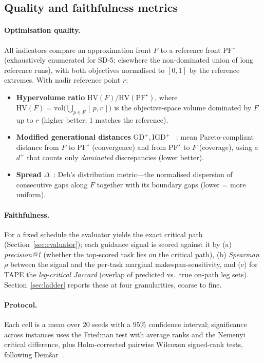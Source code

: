 \documentclass[11pt]{article}
\begin{document}
\subsection{Quality and faithfulness metrics}
\label{sec:metrics}
\paragraph{Optimisation quality.} All indicators compare an approximation front $F$ to a
reference front $\mathrm{PF}^\star$ (exhaustively enumerated for \textsf{SD-5}; elsewhere the
non-dominated union of long reference runs), with both objectives normalised to $[0,1]$ by the
reference extremes. With nadir reference point $r$:
\begin{itemize}[leftmargin=*,topsep=1pt,itemsep=1pt]
\item \textbf{Hypervolume ratio} $\mathrm{HV}(F)/\mathrm{HV}(\mathrm{PF}^\star)$, where
$\mathrm{HV}(F)=\mathrm{vol}\!\big(\bigcup_{p\in F}[\,p,r\,]\big)$ is the objective-space volume
dominated by $F$ up to $r$ (higher better; $1$ matches the reference).
\item \textbf{Modified generational distances} $\mathrm{GD}^+,\mathrm{IGD}^+$%
~\cite{ishibuchi2015igdplus}: mean Pareto-compliant distance from $F$ to $\mathrm{PF}^\star$
(convergence) and from $\mathrm{PF}^\star$ to $F$ (coverage), using a $d^+$ that counts only
\emph{dominated} discrepancies (lower better).
\item \textbf{Spread} $\Delta$~\cite{deb2002nsga2}: Deb's distribution metric---the normalised
dispersion of consecutive gaps along $F$ together with its boundary gaps (lower = more uniform).
\end{itemize}
\paragraph{Faithfulness.} For a fixed schedule the evaluator yields the exact critical path
(Section~\ref{sec:evaluator}); each guidance signal is scored against it by (a) \emph{precision@1}
(whether the top-scored task lies on the critical path), (b) \emph{Spearman $\rho$} between the signal
and the per-task marginal makespan-sensitivity, and (c) for TAPE the \emph{leg-critical
Jaccard} (overlap of predicted vs.\ true on-path leg sets). Section~\ref{sec:ladder} reports
these at four granularities, coarse to fine.
\paragraph{Protocol.} Each cell is a mean over $20$ seeds with a $95\%$
confidence interval; significance across instances uses the Friedman test with average ranks
and the Nemenyi critical difference, plus Holm-corrected pairwise Wilcoxon signed-rank tests,
following Dem\v{s}ar~\cite{demsar2006}.
\end{document}
